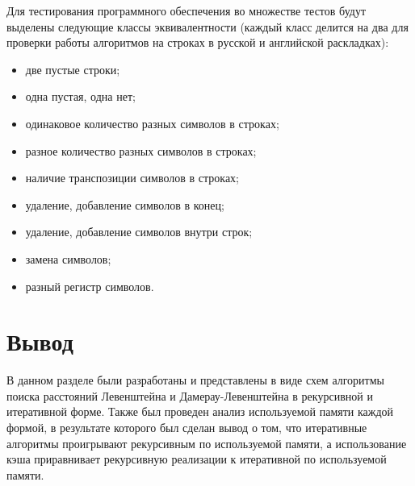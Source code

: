 Для тестирования программного обеспечения во множестве тестов будут выделены
следующие классы эквивалентности (каждый класс делится на два для проверки
работы алгоритмов на строках в русской и английской раскладках):
\begin{itemize}[left=\parindent]
    \item две пустые строки;
    \item одна пустая, одна нет;
    \item одинаковое количество разных символов в строках;
    \item разное количество разных символов в строках;
    \item наличие транспозиции символов в строках;
    \item удаление, добавление символов в конец;
    \item удаление, добавление символов внутри строк;
    \item замена символов;
    \item разный регистр символов.
\end{itemize}

\section{Вывод}

В данном разделе были разработаны и представлены в виде схем алгоритмы поиска
расстояний Левенштейна и Дамерау-Левенштейна в рекурсивной и итеративной форме.
Также был проведен анализ используемой памяти каждой формой, в результате
которого был сделан вывод о том, что итеративные алгоритмы проигрывают
рекурсивным по используемой памяти, а использование кэша приравнивает
рекурсивную реализации к итеративной по используемой памяти.
